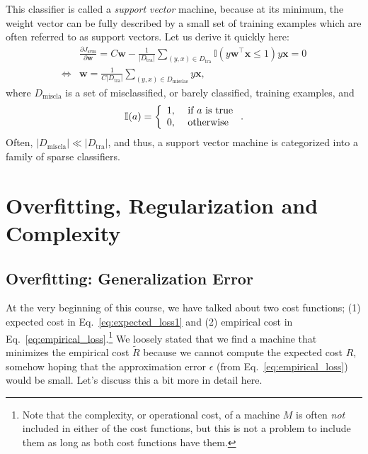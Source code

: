 \documentclass{report}
\newcommand{\vect}[1]{\mathbf{#1}}
\newcommand{\vx}[0]{\vect{x}}
\newcommand{\vw}[0]{\vect{w}}
\newcommand{\todo}[1]{{\Large\textcolor{red}{#1}}}
\newcommand{\tra}{\text{tra}}
\begin{document}
This classifier is called a {\it support vector} machine, because at its
minimum, the weight vector can be fully described by a small set of training
examples which are often referred to as support vectors. Let us derive it
quickly here:
\begin{align*}
    &\frac{\partial J_{\text{svm}}}{\partial \vw} = 
    C \vw - \frac{1}{|D_{\tra}|} \sum_{(y, x) \in D_{\tra}} \mathbb{I}(y\vw^\top
    \vx \leq 1) y \vx = 0 \\
    \Leftrightarrow&
    \vw = \frac{1}{C|D_{\tra}|} \sum_{(y, x) \in D_{\text{misclas}}} y \vx,
\end{align*}
where $D_{\text{miscla}}$ is a set of misclassified, or barely classified,
training examples, and
\begin{align*}
    \mathbb{I}(a) = \left\{ 
        \begin{array}{l l}
            1,&\text{ if }a\text{ is true} \\
            0,&\text{ otherwise}
        \end{array}
        \right..
\end{align*} 
Often, $|D_{\text{miscla}}| \ll |D_{\tra}|$, and thus, a support vector machine
is categorized into a family of sparse classifiers.

%
%
%

\section{Overfitting, Regularization and Complexity}

\subsection{Overfitting: Generalization Error}

At the very beginning of this course, we have talked about two cost functions;
(1) expected cost in Eq.~\eqref{eq:expected_loss1} and (2) empirical cost in
Eq.~\eqref{eq:empirical_loss}.\footnote{
    Note that the complexity, or operational cost, of a machine $M$ is often
    {\it not} included in either of the cost functions, but this is not a
    problem to include them as long as both cost functions have them. 
} We loosely stated that we find a machine that minimizes the empirical cost
$\tilde{R}$ because we cannot compute the expected cost $R$, somehow hoping that
the approximation error $\epsilon$ (from Eq.~\eqref{eq:empirical_loss}) would be
small. Let's discuss this a bit more in detail here.
\end{document}
